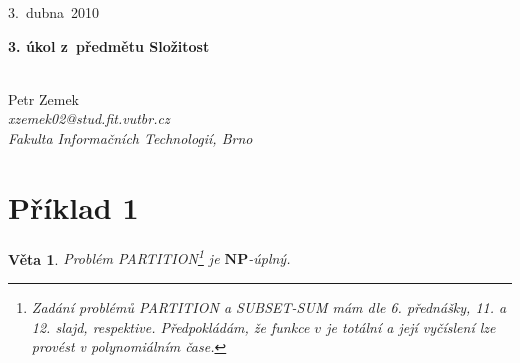 \documentclass[10pt,a4paper]{article}
\newtheorem{theorem}{Věta}
\begin{document}
\begin{flushright}
	3.~dubna~2010
\end{flushright}

\begin{center}
	\begin{large}\textbf{3. úkol z~předmětu Složitost}\end{large} \\
	\vspace{0.4cm}
	Petr Zemek \\
	\textit{xzemek02@stud.fit.vutbr.cz} \\
	\textit{Fakulta Informačních Technologií, Brno} \\
\end{center}

\section*{Příklad 1}

\begin{theorem}
\label{theorem:Ex1}
	Problém PARTITION\footnote{Zadání problémů PARTITION a SUBSET-SUM mám dle 6. přednášky, 11. a 12. slajd, respektive. Předpokládám, že funkce $v$ je totální a její vyčíslení lze provést v polynomiálním čase.} je $\textbf{NP}$-úplný.
\end{theorem}
\end{document}
